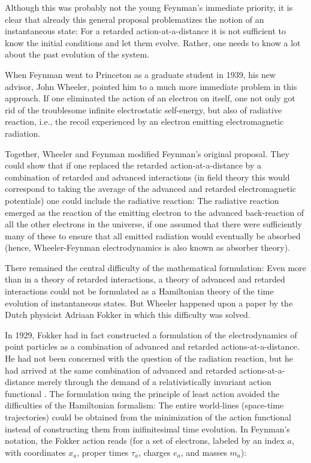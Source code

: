 \documentclass[12pt,a4paper]{article}
\begin{document}
Although this was probably not the young Feynman's immediate priority, it is clear that already this general proposal problematizes the notion of an instantaneous state: For a retarded action-at-a-distance it is not sufficient to know the initial conditions and let them evolve. Rather, one needs to know a lot about the past evolution of the system. 

When Feynman went to Princeton as a graduate student in 1939, his new advisor, John Wheeler, pointed him to a much more immediate problem in this approach. If one eliminated the action of an electron on itself, one not only got rid of the troublesome infinite electrostatic self-energy, but also of radiative reaction, i.e., the recoil experienced by an electron emitting electromagnetic radiation.

Together, Wheeler and Feynman modified Feynman's original proposal. They could show that if one replaced the retarded action-at-a-distance by a combination of retarded and advanced interactions (in field theory this would correspond to taking the average of the advanced and retarded electromagnetic potentials) one could include the radiative reaction: The radiative reaction emerged as the reaction of the emitting electron to the advanced back-reaction of all the other electrons in the universe, if one assumed that there were sufficiently many of these to ensure that all emitted radiation would eventually be absorbed (hence, Wheeler-Feynman electrodynamics is also known as absorber theory).

There remained the central difficulty of the mathematical formulation: Even more than in a theory of retarded interactions, a theory of advanced and retarded interactions could not be formulated as a Hamiltonian theory of the time evolution of instantaneous states. But Wheeler happened upon a paper by the Dutch physicist Adriaan Fokker in which this difficulty was solved.

In 1929, Fokker had in fact constructed a formulation of the electrodynamics of point particles as a combination of advanced and retarded actions-at-a-distance. He had not been concerned with the question of the radiation reaction, but he had arrived at the same combination of advanced and retarded actions-at-a-distance merely through the demand of a relativistically invariant action functional \citep{fokker_1929_wederkeerigheid}. The formulation using the principle of least action avoided the difficulties of the Hamiltonian formalism: The entire world-lines (space-time trajectories) could be obtained from the minimization of the action functional instead of constructing them from inifinitesimal time evolution. In Feynman's notation, the Fokker action reads (for a set of electrons, labeled by an index $a$, with coordinates $x_a$, proper times $\tau_a$, charges $e_a$, and masses $m_a$):
\end{document}

